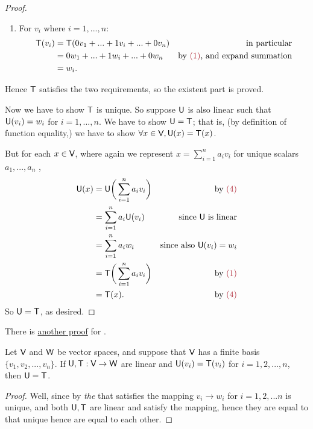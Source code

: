 \begin{proof}
\begin{enumerate}
\item
For \(v_i\) where \(i = 1, ..., n\):
\begin{align*}
    \T(v_i) & = \T(0 v_1 + ... + 1 v_i + ... + 0 v_n) & \text{in particular} \\
            & = 0 w_1 + ... + 1 w_i + ... + 0 w_n & \text{by \MAROON{(1)}, and expand summation} \\
            & = w_i.
\end{align*}
\end{enumerate}
Hence \(\textsf{T}\) satisfies the two requirements, so the existent part is proved.

Now we have to show \(\textsf{T}\) is unique.
So suppose \(\textsf{U}\) is also linear such that \(\textsf{U}(v_i) = w_i\) for \(i = 1, ..., n\).
We have to show \(\textsf{U} = \textsf{T}\);
that is, (by definition of function equality,) we have to show \(\forall x \in \textsf{V}, \textsf{U}(x) = \textsf{T}(x)\).

But for each \(x \in \textsf{V}\), where again we represent \(x = \sum_{i = 1}^n a_i v_i\) for unique scalars \(a_1, ..., a_n\) ,
\begin{align*}
    \U(x) & = \U\bigg(\sum_{i = 1}^n a_i v_i\bigg) & \text{by \MAROON{(4)}}\\
           & = \sum_{i = 1}^n a_i \U(v_i) & \text{since \(\U\) is linear} \\
           & = \sum_{i = 1}^n a_i w_i & \text{since also \(\U(v_i) = w_i\)} \\
           & = \T\bigg(\sum_{i = 1}^n a_i v_i\bigg) & \text{by \MAROON{(1)}} \\
           & = \T(x). & \text{by \MAROON{(4)}}
\end{align*}
So \(\textsf{U} = \textsf{T}\), as desired.
\end{proof}

\begin{note}
There is \href{https://www.youtube.com/watch?v=gAlUekIYKLA&ab_channel=DrPeyam}{another proof} for .
\end{note}

\begin{corollary} \label{corollary 2.6.1}
\sloppy Let \(\textsf{V}\) and \(\textsf{W}\) be vector spaces, and suppose that \(\textsf{V}\) has a finite basis \(\{ v_1, v_2, ..., v_n \}\).
If \(\textsf{U}, \textsf{T} : \textsf{V} \to \textsf{W}\) are linear and \(\textsf{U}(v_i) = \textsf{T}(v_i)\) for \(i = 1, 2, ..., n\), then \(\textsf{U} = \textsf{T}\).
\end{corollary}

\begin{proof}
Well, since by  \emph{the} \LTRAN{} that satisfies the mapping \(v_i \to w_i\) for \(i = 1, 2, ... n\) is unique,
and both \(\textsf{U}, \textsf{T}\) are linear and satisfy the mapping, hence they are equal to that unique \LTRAN{} hence are equal to each other.
\end{proof}

